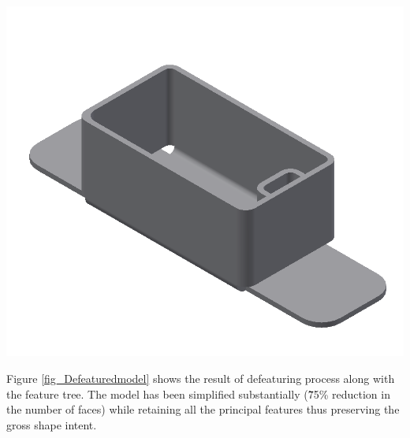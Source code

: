 

\begin{minipage}{\linewidth}
\begin{minipage}[c]{0.62\linewidth}
\includegraphics[width=\linewidth,valign=t]{images/SheetMetal_Medium_Enclosure_DefeaturedPart}

 \label{fig_Defeaturedmodel}

\bigskip

Figure \ref{fig_Defeaturedmodel} shows the result of defeaturing process along with the feature tree. The model has been simplified substantially (\~75\% reduction in the number of faces) while retaining all the principal features thus preserving the gross shape intent.


\end{minipage}
\end{minipage}
